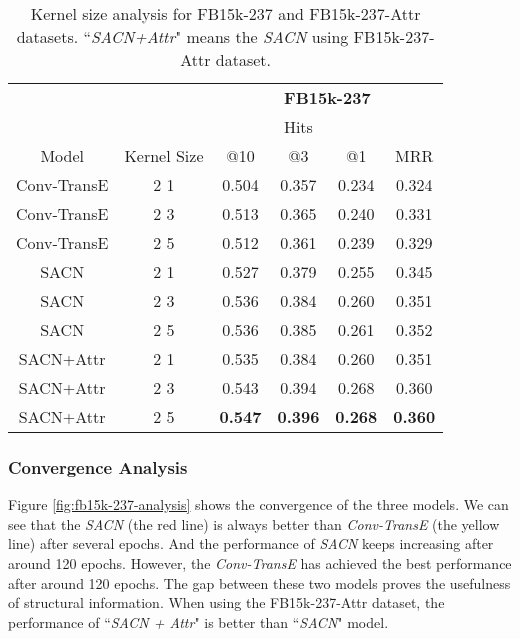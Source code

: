 \documentclass[letterpaper]{article} \usepackage{aaai19}  \usepackage{times}  \usepackage{helvet}  \usepackage{courier}  \usepackage{url}  \usepackage{graphicx}  \usepackage{amsmath}
\begin{document}
\begin{table}
\caption{Kernel size analysis for FB15k-237 and FB15k-237-Attr datasets. ``{\it  SACN+Attr}" means the {\it SACN} using FB15k-237-Attr dataset.}
    \bigskip
    \label{tab:table4}
    \tabcolsep=0.155cm
    \centering
\begin{tabular}{c|c|c|c|c|c}
        \hline
        & & \multicolumn{4}{c}{\textbf{FB15k-237}} \\
        \cline{3-6}
        & & \multicolumn{3}{c|}{Hits} & \multicolumn{1}{c}{}  \\
        \cline{3-6}
        Model & Kernel Size & @10 & @3 & @1 & MRR  \\
        \hline
        \hline
Conv-TransE & 2  1 & 0.504 & 0.357 & 0.234 & 0.324 \\
        \hline
        Conv-TransE & 2  3  & 0.513  & 0.365 & 0.240 & 0.331  \\
        \hline
        Conv-TransE & 2  5 & 0.512 & 0.361 & 0.239 & 0.329  \\
        \hline
        \hline
        SACN & 2  1  & 0.527 & 0.379 & 0.255 & 0.345  \\
\hline
        SACN & 2  3 & 0.536 & 0.384 & 0.260 & 0.351  \\
        \hline
        SACN & 2  5  & 0.536 & 0.385 & 0.261 & 0.352  \\
        \hline
        \hline
        SACN+Attr & 2  1 & 0.535 & 0.384 & 0.260 & 0.351\\
        \hline
        SACN+Attr & 2  3 & 0.543 & 0.394 & 0.268 & 0.360  \\
        \hline
        SACN+Attr & 2  5 & \textbf{0.547} & \textbf{0.396} & \textbf{0.268} & \textbf{0.360} \\
        \hline


    \end{tabular}
\end{table}

\subsubsection{Convergence Analysis}
Figure \ref{fig:fb15k-237-analysis} shows the convergence of the three models. 
We can see that the {\it SACN} (the red line) is always better than {\it Conv-TransE} (the yellow line) after several epochs. And the performance of {\it SACN} keeps increasing after around 120 epochs. However, the {\it Conv-TransE} has achieved the best performance after around 120 epochs. The gap between these two models proves the usefulness of structural information.
When using the FB15k-237-Attr dataset, the performance of ``{\it SACN + Attr}" is better than ``{\it SACN}" model. 
\end{document}
